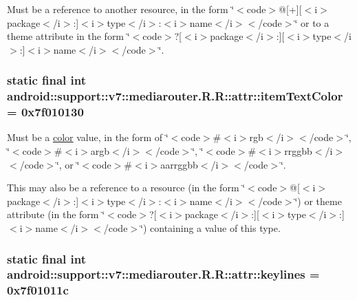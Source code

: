 Must be a reference to another resource, in the form \char`\"{}$<$code$>$@\mbox{[}+\mbox{]}\mbox{[}$<$i$>$package$<$/i$>$:\mbox{]}$<$i$>$type$<$/i$>$:$<$i$>$name$<$/i$>$$<$/code$>$\char`\"{} or to a theme attribute in the form \char`\"{}$<$code$>$?\mbox{[}$<$i$>$package$<$/i$>$:\mbox{]}\mbox{[}$<$i$>$type$<$/i$>$:\mbox{]}$<$i$>$name$<$/i$>$$<$/code$>$\char`\"{}. \hypertarget{classandroid_1_1support_1_1v7_1_1mediarouter_1_1_r_1_1attr_e277cbbb0857cb6d4bbd3e662be6f13a}{
\subsubsection[{itemTextColor}]{\setlength{\rightskip}{0pt plus 5cm}static final int android::support::v7::mediarouter.R.R::attr::itemTextColor = 0x7f010130}}
\label{classandroid_1_1support_1_1v7_1_1mediarouter_1_1_r_1_1attr_e277cbbb0857cb6d4bbd3e662be6f13a}


Must be a \hyperlink{classandroid_1_1support_1_1v7_1_1mediarouter_1_1_r_1_1color}{color} value, in the form of \char`\"{}$<$code$>$\#$<$i$>$rgb$<$/i$>$$<$/code$>$\char`\"{}, \char`\"{}$<$code$>$\#$<$i$>$argb$<$/i$>$$<$/code$>$\char`\"{}, \char`\"{}$<$code$>$\#$<$i$>$rrggbb$<$/i$>$$<$/code$>$\char`\"{}, or \char`\"{}$<$code$>$\#$<$i$>$aarrggbb$<$/i$>$$<$/code$>$\char`\"{}. 

This may also be a reference to a resource (in the form \char`\"{}$<$code$>$@\mbox{[}$<$i$>$package$<$/i$>$:\mbox{]}$<$i$>$type$<$/i$>$:$<$i$>$name$<$/i$>$$<$/code$>$\char`\"{}) or theme attribute (in the form \char`\"{}$<$code$>$?\mbox{[}$<$i$>$package$<$/i$>$:\mbox{]}\mbox{[}$<$i$>$type$<$/i$>$:\mbox{]}$<$i$>$name$<$/i$>$$<$/code$>$\char`\"{}) containing a value of this type. \hypertarget{classandroid_1_1support_1_1v7_1_1mediarouter_1_1_r_1_1attr_02cd1fce908e667aba4419a270c7b3c9}{
\subsubsection[{keylines}]{\setlength{\rightskip}{0pt plus 5cm}static final int android::support::v7::mediarouter.R.R::attr::keylines = 0x7f01011c}}
\label{classandroid_1_1support_1_1v7_1_1mediarouter_1_1_r_1_1attr_02cd1fce908e667aba4419a270c7b3c9}


